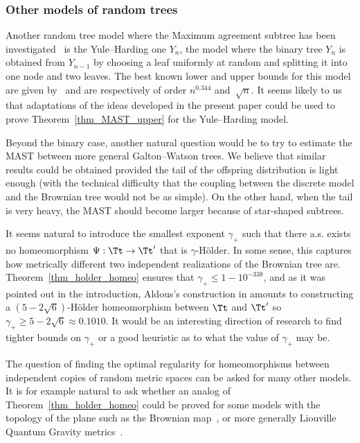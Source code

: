 \subsubsection*{Other models of random trees}
Another random tree model where the Maximum agreement subtree has been investigated~\cite{bryant_size_2003, bernstein_bounds_2015} is the Yule--Harding one $Y_n$, \ie the model where the binary tree $Y_n$ is obtained from $Y_{n-1}$ by choosing a leaf uniformly at random and splitting it into one node and two leaves. The best known lower and upper bounds for this model are given by~\cite{bernstein_bounds_2015} and are respectively of order $n^{0.344}$ and~$\sqrt{n}$.
It seems likely to us that adaptations of the ideas developed in the present paper could be used to prove Theorem~\ref{thm_MAST_upper} for the Yule--Harding model.

Beyond the binary case, another natural question would be to try to estimate the MAST between more general Galton--Watson trees.
We believe that similar results could be obtained provided the tail of the offspring distribution is light enough (with the technical difficulty that the coupling between the discrete model and the Brownian tree would not be as simple).
On the other hand, when the tail is very heavy, the MAST should become larger because of star-shaped subtrees.

It seems natural to introduce the smallest exponent $\gamma_+$ such that there a.s. exists no homeomorphism $\Psi : \Tt\rightarrow \Tt'$ that is $\gamma$-Hölder. In some sense, this captures how metrically different two independent realizations of the Brownian tree are.
Theorem~\ref{thm_holder_homeo} ensures that $\gamma_{+} \leq 1-10^{-338}$, and as it was pointed out in the introduction, Aldous's construction in \cite{aldous_largest_2022} amounts to constructing a $(5-2\sqrt{6})$-Hölder homeomorphism between $\Tt$ and $\Tt'$ so $\gamma_{+}\geq 5-2\sqrt{6} \approx 0.1010$.
It would be an interesting direction of research to find tighter bounds on $\gamma_{+}$ or a good heuristic as to what the value of $\gamma_{+}$ may be.

The question of finding the optimal regularity for homeomorphisms between independent copies of random metric spaces can be asked for many other models.
It is for example natural to ask whether an analog of Theorem~\ref{thm_holder_homeo} could be proved for some models with the topology of the plane such as the Brownian map~\cite{LG11, Mie11}, or more generally Liouville Quantum Gravity metrics~\cite{GM21}.

